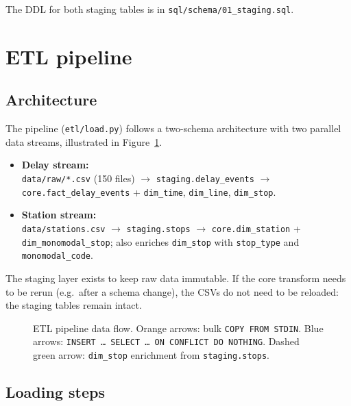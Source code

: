 \documentclass[a4paper,11pt]{article}
\begin{document}
The DDL for both staging tables is in \texttt{sql/schema/01\_staging.sql}.


\newpage
\section{ETL pipeline}
\label{sec:etl}

\subsection{Architecture}

The pipeline (\texttt{etl/load.py}) follows a two-schema architecture with two
parallel data streams, illustrated in Figure~\ref{fig:etl-flow}.

\begin{itemize}
  \item \textbf{Delay stream:}\\
    \texttt{data/raw/*.csv} (150 files) $\to$ \texttt{staging.delay\_events}
    $\to$ \texttt{core.fact\_delay\_events} + \texttt{dim\_time}, \texttt{dim\_line},
    \texttt{dim\_stop}.
  \item \textbf{Station stream:}\\
    \texttt{data/stations.csv} $\to$ \texttt{staging.stops}
    $\to$ \texttt{core.dim\_station} + \texttt{dim\_monomodal\_stop};
    also enriches \texttt{dim\_stop} with \texttt{stop\_type} and
    \texttt{monomodal\_code}.
\end{itemize}

The staging layer exists to keep raw data immutable.
If the core transform needs to be rerun (e.g.\ after a schema change), the
CSVs do not need to be reloaded: the staging tables remain intact.

\begin{figure}[H]
  \centering
  
  \caption{ETL pipeline data flow.
    Orange arrows: bulk \texttt{COPY FROM STDIN}.
    Blue arrows: \texttt{INSERT \ldots{} SELECT \ldots{} ON CONFLICT DO NOTHING}.
    Dashed green arrow: \texttt{dim\_stop} enrichment from \texttt{staging.stops}.}
  \label{fig:etl-flow}
\end{figure}

\subsection{Loading steps}
\end{document}
